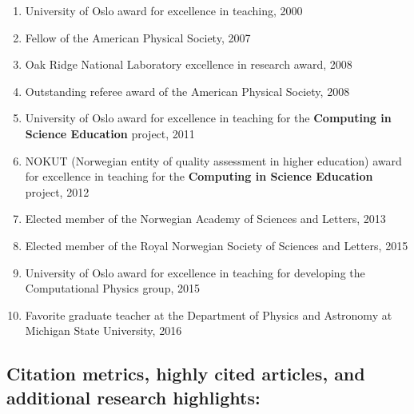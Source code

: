 \documentclass[a4wide,10pt]{article}
\begin{document}
\begin{enumerate}
\item University of Oslo award for excellence in teaching, 2000

\item Fellow of the American Physical Society, 2007

\item Oak Ridge National Laboratory excellence in research award, 2008

\item Outstanding referee award of the American Physical Society, 2008

\item University of Oslo award for excellence in teaching for the \textbf{Computing in Science Education} project, 2011

\item NOKUT (Norwegian entity of quality assessment in higher education) award for excellence in teaching for the \textbf{Computing in Science Education} project, 2012

\item Elected member of the Norwegian Academy of Sciences and Letters, 2013

\item Elected member of the Royal Norwegian Society of Sciences and Letters, 2015 

\item University of Oslo award for excellence in teaching for developing the Computational Physics group, 2015

\item Favorite graduate teacher at the Department of Physics and Astronomy at Michigan State University, 2016 
\end{enumerate}

\subsection*{Citation metrics, highly cited articles, and additional research highlights:}
\end{document}
